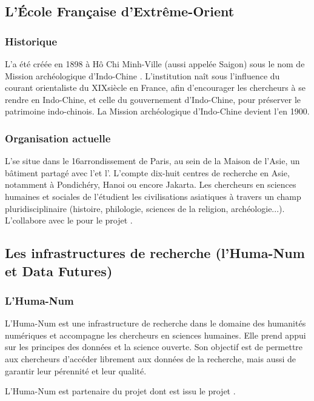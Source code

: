 \subsection{L’École Française d'Extrême-Orient}

\subsubsection{Historique}
L'\EFEO a été créée en 1898 à Hô Chi Minh-Ville (aussi appelée Saigon) sous le nom de \og Mission archéologique d'Indo-Chine \fg. L'institution naît sous l'influence du courant orientaliste du XIX\ieme siècle en France, afin d'encourager les chercheurs à se rendre en Indo-Chine, et celle du gouvernement d'Indo-Chine, pour préserver le patrimoine indo-chinois. La \og Mission archéologique d'Indo-Chine \fg devient l'\EFEO en 1900.

\subsubsection{Organisation actuelle}
L'\EFEO se situe dans le 16\ieme arrondissement de Paris, au sein de la Maison de l'Asie, un bâtiment partagé avec l'\EPHE et l'\EHESS. L'\EFEO compte dix-huit centres de recherche en Asie, notamment à Pondichéry, Hanoi ou encore Jakarta. Les chercheurs en sciences humaines et sociales de l'\EFEO étudient les civilisations asiatiques à travers un champ pluridisciplinaire (histoire, philologie, sciences de la religion, archéologie...). L'\EFEO collabore avec le \cdf pour le projet \COREL. 

\subsection{Les infrastructures de recherche (l'\IR* Huma-Num et Data Futures)}
\subsubsection{L'\IR* Huma-Num}
L'\IR* Huma-Num est une infrastructure de recherche dans le domaine des humanités numériques et accompagne les chercheurs en sciences humaines. Elle prend appui sur les principes \fair des données et la science ouverte. Son objectif est de permettre aux chercheurs d'accéder librement aux données de la recherche, mais aussi de garantir leur pérennité et leur qualité. 

L'\IR* Huma-Num est partenaire du projet \LSC dont est issu le projet \COREL. 

